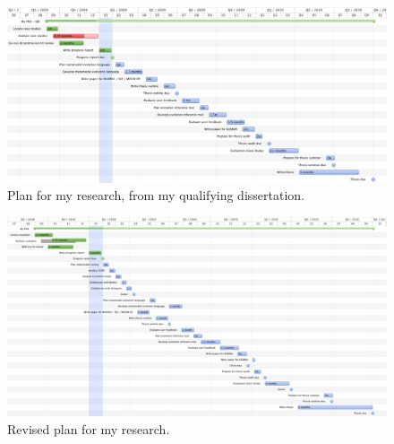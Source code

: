 \documentclass[10pt]{article}
\begin{document}
	
	\begin{landscape}

		\begin{figure}[ht]
		  \begin{center}
		    \leavevmode
		    \includegraphics[scale=0.7]{old_plan.png}
		  \end{center}
		  \caption{Plan for my research, from my qualifying dissertation.}
		  \label{fig:old_plan}
		\end{figure}

		\begin{figure}[ht]
		  \begin{center}
		    \leavevmode
		    \includegraphics[scale=0.7]{revised_plan.png}
		  \end{center}
		  \caption{Revised plan for my research.}
		  \label{fig:revised_plan}
		\end{figure}

	\end{landscape}
\end{document}
